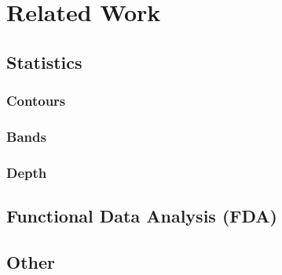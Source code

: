 \chapter{Related Work}

\section{Statistics}
\subsection{Contours}
\subsection{Bands}
\subsection{Depth}

\section{Functional Data Analysis (FDA)}

\section{Other}
